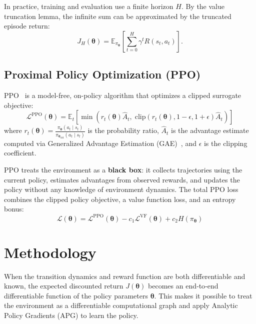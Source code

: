 \documentclass[11pt,a4paper]{article}
\newcommand{\E}{\mathbb{E}}
\newcommand{\cL}{\mathcal{L}}
\newcommand{\btheta}{\bm{\theta}}
\begin{document}
In practice, training and evaluation use a finite horizon $H$. By the value truncation lemma, the infinite sum can be approximated by the truncated episode return:
\begin{equation}
  J_H(\btheta) = \E_{\pi_{\btheta}}\left[\sum_{t=0}^{H} \gamma^t R(s_t, a_t)\right].
  \label{eq:truncated_objective}
\end{equation}

\subsection{Proximal Policy Optimization (PPO)}
\label{sec:ppo}

PPO~\cite{schulman2017ppo} is a model-free, on-policy algorithm that optimizes a clipped surrogate objective:
\begin{equation}
  \cL^{\text{PPO}}(\btheta) = \E_t\left[\min\left(r_t(\btheta) \hat{A}_t, \; \text{clip}\left(r_t(\btheta), 1-\epsilon, 1+\epsilon\right) \hat{A}_t\right)\right]
  \label{eq:ppo_loss}
\end{equation}
where $r_t(\btheta) = \frac{\pi_{\btheta}(a_t \mid s_t)}{\pi_{\btheta_{\text{old}}}(a_t \mid s_t)}$ is the probability ratio, $\hat{A}_t$ is the advantage estimate computed via Generalized Advantage Estimation (GAE)~\cite{schulman2016gae}, and $\epsilon$ is the clipping coefficient.

PPO treats the environment as a \textbf{black box}: it collects trajectories using the current policy, estimates advantages from observed rewards, and updates the policy without any knowledge of environment dynamics. The total PPO loss combines the clipped policy objective, a value function loss, and an entropy bonus:
\begin{equation}
  \cL(\btheta) = \cL^{\text{PPO}}(\btheta) - c_1 \cL^{\text{VF}}(\btheta) + c_2 H(\pi_{\btheta})
  \label{eq:ppo_total}
\end{equation}

\section{Methodology}
\label{sec:methodology}
When the transition dynamics and reward function are both differentiable and known, the expected discounted return $J(\btheta)$ becomes an end‑to‑end differentiable function of the policy parameters $\btheta$. This makes it possible to treat the environment as a differentiable computational graph and apply Analytic Policy Gradients (APG) to learn the policy.
\end{document}
